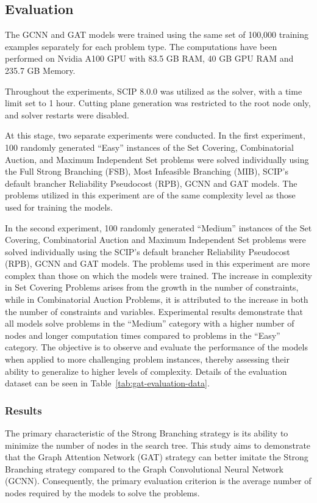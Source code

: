 \subsection{Evaluation}
The GCNN and GAT models were trained using the same set of 100,000 training examples separately for each problem type.
The computations have been performed on Nvidia A100 GPU with 83.5 GB RAM, 40 GB GPU RAM and 235.7 GB Memory.


Throughout the experiments, SCIP 8.0.0 was utilized as the solver, with a time limit set to 1 hour.
Cutting plane generation was restricted to the root node only, and solver restarts were disabled.


At this stage, two separate experiments were conducted.
In the first experiment, 100 randomly generated “Easy” instances of the Set Covering, Combinatorial Auction, and Maximum Independent Set problems were solved individually using the Full Strong Branching (FSB), Most Infeasible Branching (MIB), SCIP’s default brancher Reliability Pseudocost (RPB), GCNN and GAT models.
The problems utilized in this experiment are of the same complexity level as those used for training the models.


In the second experiment, 100 randomly generated “Medium” instances of the Set Covering, Combinatorial Auction and Maximum Independent Set problems were solved individually using the SCIP’s default brancher Reliability Pseudocost (RPB), GCNN and GAT models.
The problems used in this experiment are more complex than those on which the models were trained.
The increase in complexity in Set Covering Problems arises from the growth in the number of constraints, while in Combinatorial Auction Problems, it is attributed to the increase in both the number of constraints and variables.
Experimental results demonstrate that all models solve problems in the “Medium” category with a higher number of nodes and longer computation times compared to problems in the “Easy” category.
The objective is to observe and evaluate the performance of the models when applied to more challenging problem instances, thereby assessing their ability to generalize to higher levels of complexity.
Details of the evaluation dataset can be seen in Table~\ref{tab:gat-evaluation-data}.




\subsubsection{Results}
The primary characteristic of the Strong Branching strategy is its ability to minimize the number of nodes in the search tree.
This study aims to demonstrate that the Graph Attention Network (GAT) strategy can better imitate the Strong Branching strategy compared to the Graph Convolutional Neural Network (GCNN).
Consequently, the primary evaluation criterion is the average number of nodes required by the models to solve the problems.


